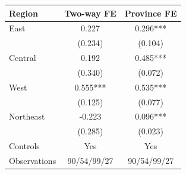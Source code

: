 \begin{tabular}{lcc}
\toprule
Region & Two-way FE & Province FE \\
\midrule
East & 0.227 & 0.296*** \\
 & (0.234) & (0.104) \\[2pt]
Central & 0.192 & 0.485*** \\
 & (0.340) & (0.072) \\[2pt]
West & 0.555*** & 0.535*** \\
 & (0.125) & (0.077) \\[2pt]
Northeast & -0.223 & 0.096*** \\
 & (0.285) & (0.023) \\[2pt]
Controls & Yes & Yes \\
Observations & 90/54/99/27 & 90/54/99/27 \\
\bottomrule
\end{tabular}